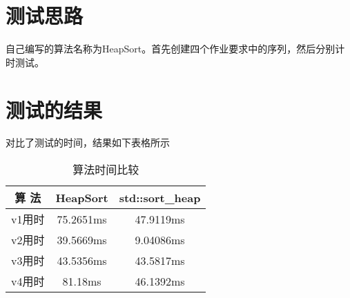 \documentclass[UTF8]{ctexart}
\begin{document}
\pagestyle{fancy}
\fancyhead{}

\section{测试思路}

自己编写的算法名称为HeapSort。首先创建四个作业要求中的序列，然后分别计时测试。

\section{测试的结果}

对比了测试的时间，结果如下表格所示

\begin{table}[htbp]
\centering
\caption{算法时间比较}
\begin{tabular}{|c|c|c|}
\hline
算 法 & HeapSort & std::sort\_heap \\ \hline
v1用时 & 75.2651ms & 47.9119ms \\ \hline
v2用时 & 39.5669ms & 9.04086ms \\ \hline
v3用时 & 43.5356ms & 43.5817ms \\ \hline
v4用时 & 81.18ms & 46.1392ms \\ \hline
\end{tabular}
\end{table}
\end{document}

